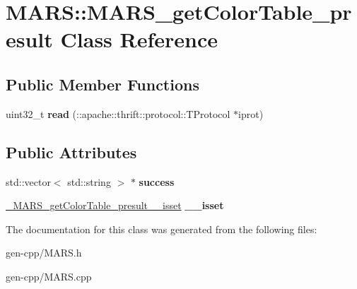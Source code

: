 \hypertarget{classMARS_1_1MARS__getColorTable__presult}{}\section{M\+A\+RS\+:\+:M\+A\+R\+S\+\_\+get\+Color\+Table\+\_\+presult Class Reference}
\label{classMARS_1_1MARS__getColorTable__presult}
\subsection*{Public Member Functions}
\begin{DoxyCompactItemize}
\item 
\mbox{\label{classMARS_1_1MARS__getColorTable__presult_a4fd9ef8e10f9916b78c2d9639942c298}} 
uint32\+\_\+t {\bfseries read} (\+::apache\+::thrift\+::protocol\+::\+T\+Protocol $\ast$iprot)
\end{DoxyCompactItemize}
\subsection*{Public Attributes}
\begin{DoxyCompactItemize}
\item 
\mbox{\label{classMARS_1_1MARS__getColorTable__presult_adbbe7ee81a4ddcb9fe4b58f1b9355d9f}} 
std\+::vector$<$ std\+::string $>$ $\ast$ {\bfseries success}
\item 
\mbox{\label{classMARS_1_1MARS__getColorTable__presult_a9ffc65771ae7ce3f4c2af348b85cf534}} 
\hyperlink{structMARS_1_1__MARS__getColorTable__presult____isset}{\+\_\+\+M\+A\+R\+S\+\_\+get\+Color\+Table\+\_\+presult\+\_\+\+\_\+isset} {\bfseries \+\_\+\+\_\+isset}
\end{DoxyCompactItemize}


The documentation for this class was generated from the following files\+:\begin{DoxyCompactItemize}
\item 
gen-\/cpp/M\+A\+R\+S.\+h\item 
gen-\/cpp/M\+A\+R\+S.\+cpp\end{DoxyCompactItemize}
